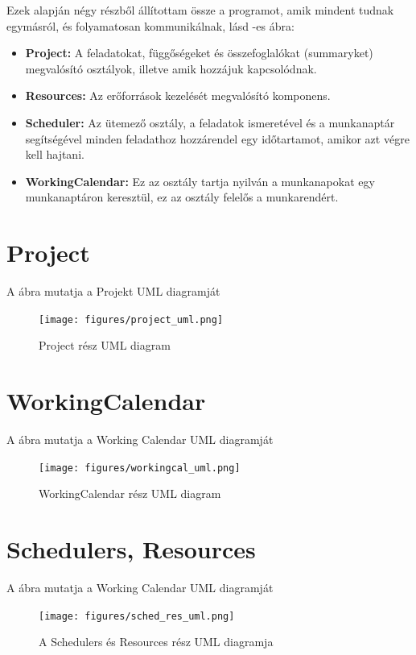 Ezek alapján négy részből állítottam össze a programot, amik mindent tudnak egymásról, és folyamatosan kommunikálnak, lásd -es ábra:
\begin{itemize}
	\item \textbf{Project:} A feladatokat, függőségeket és összefoglalókat (summaryket) megvalósító osztályok, illetve amik hozzájuk kapcsolódnak.
	\item \textbf{Resources:} Az erőforrások kezelését megvalósító komponens.
	\item \textbf{Scheduler:} Az ütemező osztály, a feladatok ismeretével és a munkanaptár segítségével minden feladathoz hozzárendel egy időtartamot, amikor azt végre kell hajtani.
	\item \textbf{WorkingCalendar:}  Ez az osztály tartja nyilván a munkanapokat egy munkanaptáron keresztül, ez az osztály felelős a munkarendért.
\end{itemize}

\section{Project}
A  ábra mutatja a Projekt UML diagramját
\begin{figure}[!ht]
\centering
\texttt{[image: figures/project\_uml.png]}
\caption{Project rész UML diagram} 
\label{fig:project_uml}
\end{figure} 
\section{WorkingCalendar}
A  ábra mutatja a Working Calendar UML diagramját
\begin{figure}[!ht]
\centering
\texttt{[image: figures/workingcal\_uml.png]}
\caption{WorkingCalendar rész UML diagram} 
\label{fig:workingcal_uml}
\end{figure} 

\section{Schedulers, Resources}

A  ábra mutatja a Working Calendar UML diagramját
\begin{figure}[!ht]
\centering
\texttt{[image: figures/sched\_res\_uml.png]}
\caption{A Schedulers és Resources rész UML diagramja} 
\label{fig:sched_res_uml}
\end{figure} 